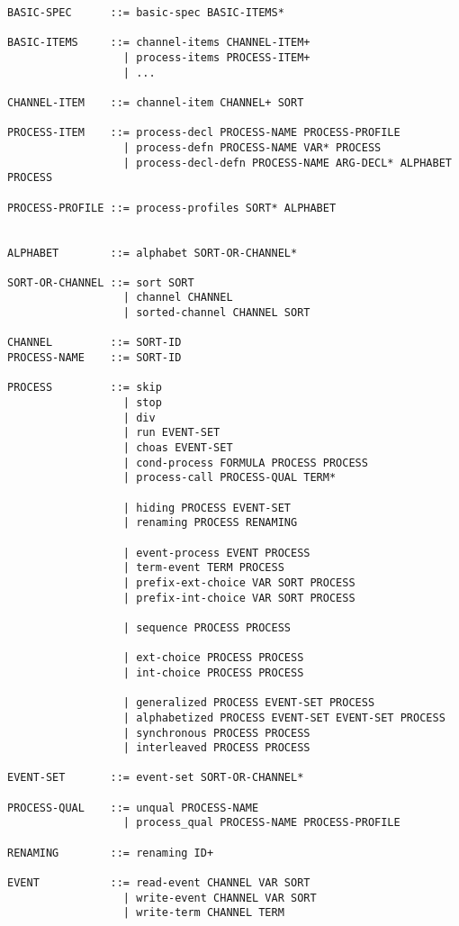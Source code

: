 \begin{verbatim}
BASIC-SPEC      ::= basic-spec BASIC-ITEMS*

BASIC-ITEMS     ::= channel-items CHANNEL-ITEM+
                  | process-items PROCESS-ITEM+
                  | ...

CHANNEL-ITEM    ::= channel-item CHANNEL+ SORT

PROCESS-ITEM    ::= process-decl PROCESS-NAME PROCESS-PROFILE
                  | process-defn PROCESS-NAME VAR* PROCESS
                  | process-decl-defn PROCESS-NAME ARG-DECL* ALPHABET PROCESS

PROCESS-PROFILE ::= process-profiles SORT* ALPHABET


ALPHABET        ::= alphabet SORT-OR-CHANNEL*

SORT-OR-CHANNEL ::= sort SORT
                  | channel CHANNEL
                  | sorted-channel CHANNEL SORT

CHANNEL         ::= SORT-ID
PROCESS-NAME    ::= SORT-ID

PROCESS         ::= skip
                  | stop
                  | div
                  | run EVENT-SET
                  | choas EVENT-SET
                  | cond-process FORMULA PROCESS PROCESS
                  | process-call PROCESS-QUAL TERM*

                  | hiding PROCESS EVENT-SET
                  | renaming PROCESS RENAMING

                  | event-process EVENT PROCESS
                  | term-event TERM PROCESS
                  | prefix-ext-choice VAR SORT PROCESS
                  | prefix-int-choice VAR SORT PROCESS

                  | sequence PROCESS PROCESS

                  | ext-choice PROCESS PROCESS
                  | int-choice PROCESS PROCESS

                  | generalized PROCESS EVENT-SET PROCESS
                  | alphabetized PROCESS EVENT-SET EVENT-SET PROCESS
                  | synchronous PROCESS PROCESS
                  | interleaved PROCESS PROCESS

EVENT-SET       ::= event-set SORT-OR-CHANNEL*

PROCESS-QUAL    ::= unqual PROCESS-NAME
                  | process_qual PROCESS-NAME PROCESS-PROFILE

RENAMING        ::= renaming ID+

EVENT           ::= read-event CHANNEL VAR SORT
                  | write-event CHANNEL VAR SORT
                  | write-term CHANNEL TERM
\end{verbatim}
